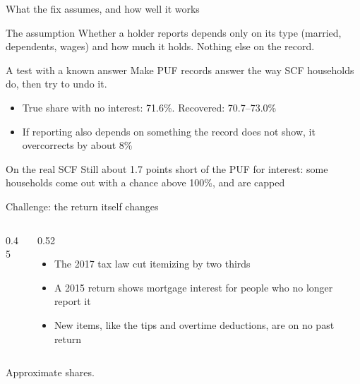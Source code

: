 \documentclass[11pt,aspectratio=169]{beamer}
\newcommand{\slidenote}[1]{\par\vfill{\scriptsize\color{yalegrey}#1}}
\begin{document}
\begin{frame}{What the fix assumes, and how well it works}
  \begin{block}{The assumption}
    Whether a holder reports depends only on its type (married, dependents, wages)
    and how much it holds. Nothing else on the record.
  \end{block}

  \vspace{0.3em}
  \begin{block}{A test with a known answer}
    Make PUF records answer the way SCF households do, then try to undo it.
    \begin{itemize}
      \item True share with no interest: 71.6\%. Recovered: 70.7--73.0\%
      \item If reporting also depends on something the record does not show,
            it overcorrects by about 8\%
    \end{itemize}
  \end{block}

  \vspace{0.3em}
  \begin{block}{On the real SCF}
    Still about 1.7 points short of the PUF for interest: some households come out
    with a chance above 100\%, and are capped
  \end{block}
\end{frame}

\begin{frame}{Challenge: the return itself changes}
  \begin{columns}[c]
    \begin{column}{0.45\textwidth}
      \centering
    \end{column}
    \begin{column}{0.52\textwidth}
      \begin{itemize}
        \item The 2017 tax law cut itemizing by two thirds
        \item A 2015 return shows mortgage interest for people who no longer report it
        \item New items, like the tips and overtime deductions, are on no past return
      \end{itemize}
    \end{column}
  \end{columns}
  \slidenote{Approximate shares.}
\end{frame}
\end{document}
